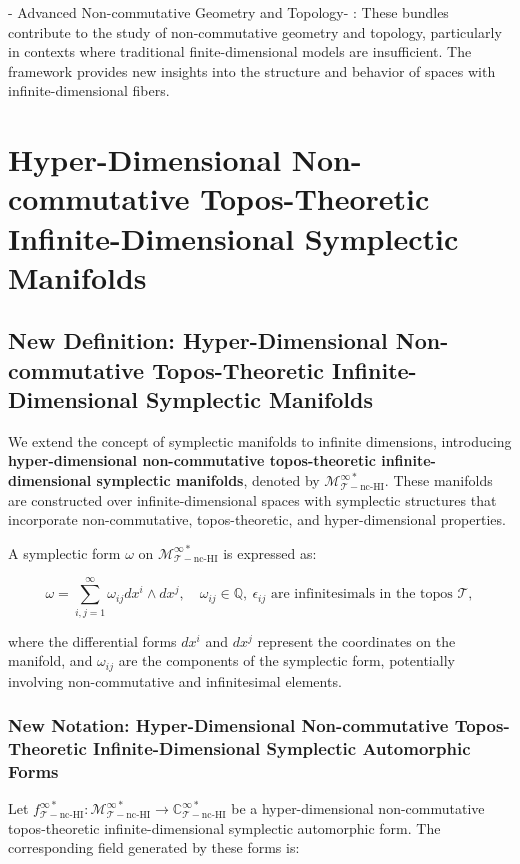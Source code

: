 \documentclass{article}
\begin{document}
-  Advanced Non-commutative Geometry and Topology- : These bundles contribute to the study of non-commutative geometry and topology, particularly in contexts where traditional finite-dimensional models are insufficient. The framework provides new insights into the structure and behavior of spaces with infinite-dimensional fibers.

\section{Hyper-Dimensional Non-commutative Topos-Theoretic Infinite-Dimensional Symplectic Manifolds}
\subsection{New Definition: Hyper-Dimensional Non-commutative Topos-Theoretic Infinite-Dimensional Symplectic Manifolds}
We extend the concept of symplectic manifolds to infinite dimensions, introducing \textbf{hyper-dimensional non-commutative topos-theoretic infinite-dimensional symplectic manifolds}, denoted by \(\mathcal{M}_{\mathcal{T}-\text{nc-HI}}^{\infty *}\). These manifolds are constructed over infinite-dimensional spaces with symplectic structures that incorporate non-commutative, topos-theoretic, and hyper-dimensional properties.

A symplectic form \(\omega\) on \(\mathcal{M}_{\mathcal{T}-\text{nc-HI}}^{\infty *}\) is expressed as:

\[
\omega = \sum_{i,j=1}^{\infty} \omega_{ij} dx^i \wedge dx^j, \quad \omega_{ij} \in \mathbb{Q}, \ \epsilon_{ij} \text{ are infinitesimals in the topos } \mathcal{T},
\]

where the differential forms \(dx^i\) and \(dx^j\) represent the coordinates on the manifold, and \(\omega_{ij}\) are the components of the symplectic form, potentially involving non-commutative and infinitesimal elements.

\subsubsection{New Notation: Hyper-Dimensional Non-commutative Topos-Theoretic Infinite-Dimensional Symplectic Automorphic Forms}
Let \(f_{\mathcal{T}-\text{nc-HI}}^{\infty *}: \mathcal{M}_{\mathcal{T}-\text{nc-HI}}^{\infty *} \to \mathbb{C}_{\mathcal{T}-\text{nc-HI}}^{\infty *}\) be a hyper-dimensional non-commutative topos-theoretic infinite-dimensional symplectic automorphic form. The corresponding field generated by these forms is:
\end{document}
